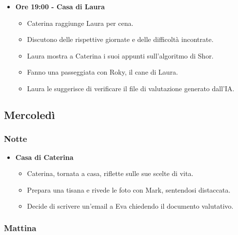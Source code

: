 \begin{itemize}
    \item \textbf{Ore 19:00 - Casa di Laura}
    \begin{itemize}
        \item Caterina raggiunge Laura per cena.
        \item Discutono delle rispettive giornate e delle difficoltà incontrate.
        \item Laura mostra a Caterina i suoi appunti sull'algoritmo di Shor.
        \item Fanno una passeggiata con Roky, il cane di Laura.
        \item Laura le suggerisce di verificare il file di valutazione generato dall'IA.
    \end{itemize}
\end{itemize}

\subsection*{Mercoledì}

\subsubsection*{Notte}

\begin{itemize}
    \item \textbf{Casa di Caterina}
    \begin{itemize}
        \item Caterina, tornata a casa, riflette sulle sue scelte di vita.
        \item Prepara una tisana e rivede le foto con Mark, sentendosi distaccata.
        \item Decide di scrivere un'email a Eva chiedendo il documento valutativo.
    \end{itemize}
\end{itemize}

\subsubsection*{Mattina}

